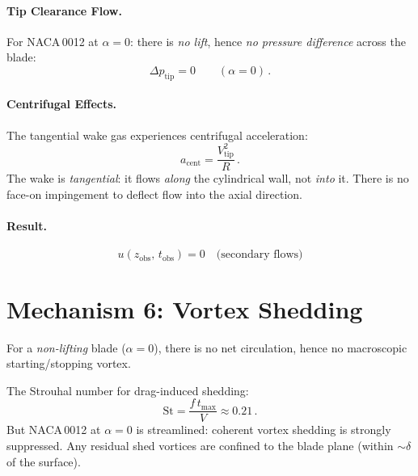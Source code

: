 \documentclass[11pt,a4paper]{article}
\begin{document}
\paragraph{Tip Clearance Flow.}
For NACA\,0012 at $\alpha = 0$: there is \emph{no lift}, hence
\emph{no pressure difference} across the blade:
\begin{equation}
  \Delta p_\mathrm{tip} = 0 \qquad (\alpha = 0)\,.
\end{equation}

\paragraph{Centrifugal Effects.}
The tangential wake gas experiences centrifugal acceleration:
\begin{equation}
  a_\mathrm{cent} = \frac{V_\mathrm{tip}^2}{R}\,.
  \label{eq:acent}
\end{equation}
The wake is \emph{tangential}: it flows \emph{along} the cylindrical
wall, not \emph{into} it. There is no face-on impingement to deflect
flow into the axial direction.

\paragraph{Result.}
\begin{equation}
  \boxed{u(z_\mathrm{obs},\, t_\mathrm{obs}) = 0
    \quad \text{(secondary flows)}}
\end{equation}


\section{Mechanism 6: Vortex Shedding}
\label{sec:vortex}

For a \emph{non-lifting} blade ($\alpha = 0$), there is no net
circulation, hence no macroscopic starting/stopping vortex.

The Strouhal number for drag-induced shedding:
\begin{equation}
  \mathrm{St} = \frac{f\, t_\mathrm{max}}{V} \approx 0.21\,.
\end{equation}
But NACA\,0012 at $\alpha = 0$ is streamlined: coherent vortex shedding
is strongly suppressed. Any residual shed vortices are confined to the
blade plane (within $\sim\delta$ of the surface).
\end{document}

